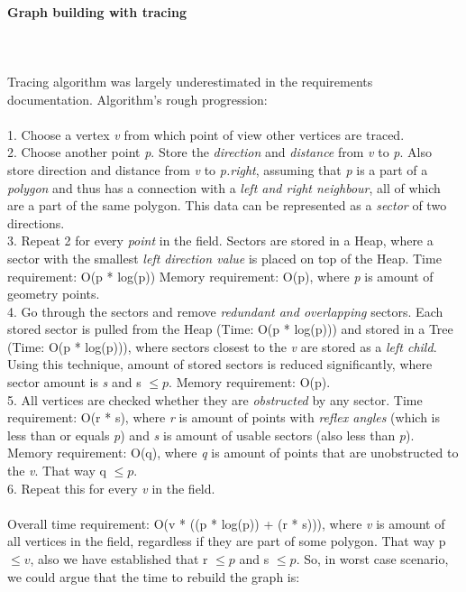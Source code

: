 \documentclass[a4paper,12pt]{article}
\begin{document}
\paragraph{\large Graph building with tracing} \hspace{0pt} \\
\\
Tracing algorithm was largely underestimated in the requirements documentation. Algorithm's rough progression: \\
\\
1. Choose a vertex \emph{v} from which point of view other vertices are traced.\\
2. Choose another point \emph{p}. Store the \emph{direction} and \emph{distance} from \emph{v} to \emph{p}. Also store direction and distance from \emph{v} to \emph{p.right}, assuming that \emph{p} is a part of a \emph{polygon} and thus has a connection with a \emph{left and right neighbour}, all of which are a part of the same polygon. This data can be represented as a \emph{sector} of two directions.\\
3. Repeat 2 for every \emph{point} in the field. Sectors are stored in a Heap, where a sector with the smallest \emph{left direction value} is placed on top of the Heap. Time requirement: O(p * log(p)) Memory requirement: O(p), where \emph{p} is amount of geometry points.\\
4. Go through the sectors and remove \emph{redundant and overlapping} sectors. Each stored sector is pulled from the Heap (Time: O(p * log(p))) and stored in a Tree (Time: O(p * log(p))), where sectors closest to the \emph{v} are stored as a \emph{left child}. Using this technique, amount of stored sectors is reduced significantly, where sector amount is \emph{s} and s $\leq{p}$. Memory requirement: O(p).\\
5. All vertices are checked whether they are \emph{obstructed} by any sector. Time requirement: O(r * s), where \emph{r} is amount of points with \emph{reflex angles} (which is less than or equals \emph{p}) and \emph{s} is amount of usable sectors (also less than \emph{p}). Memory requirement: O(q), where \emph{q} is amount of points that are unobstructed to the \emph{v}. That way q $\leq{p}$.\\
6. Repeat this for every \emph{v} in the field.\\
\\
Overall time requirement: O(v * ((p * log(p)) + (r * s))), where \emph{v} is amount of all vertices in the field, regardless if they are part of some polygon. That way p $\leq{v}$, also we have established that r $\leq{p}$ and s $\leq{p}$. So, in worst case scenario, we could argue that the time to rebuild the graph is:\\
\end{document}
